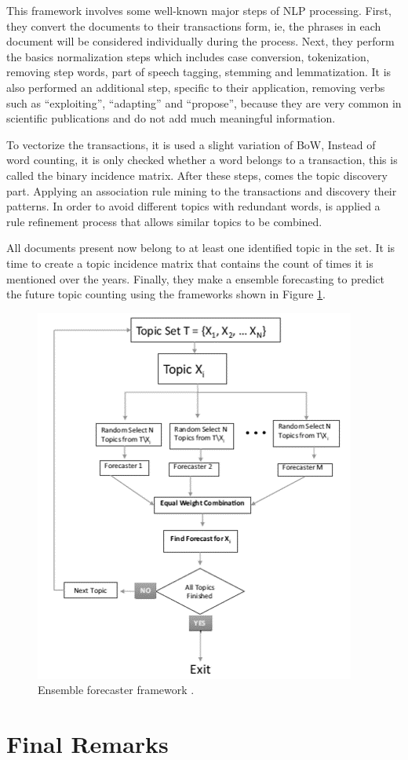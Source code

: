 This framework involves some well-known major steps of NLP processing. First, they convert the documents to their transactions form, ie, the phrases in each document will be considered individually during the process. Next, they perform the basics normalization steps which includes case conversion, tokenization, removing step words, part of speech tagging, stemming and lemmatization. It is also performed an additional step, specific to their application, removing verbs such as ``exploiting'', ``adapting'' and ``propose'', because they are very common in scientific publications and do not add much meaningful information.

To vectorize the transactions, it is used a slight variation of BoW, Instead of word counting, it is only checked whether a word belongs to a transaction, this is called the binary incidence matrix.
After these steps, comes the topic discovery part. Applying an association rule mining to the transactions and discovery their patterns. In order to avoid different topics with redundant words, is applied a rule refinement process that allows similar topics to be combined.


All documents present now belong to at least one identified topic in the set. It is time to create a topic incidence matrix that contains the count of times it is mentioned over the years. Finally, they make a ensemble forecasting to predict the future topic counting using the frameworks shown in Figure \ref{fig:ensemble-forecasting-framework}.

\begin{figure}[h!]
	\centering
	\includegraphics[width=0.5\linewidth]{01.Chapters/03.RelatedWorks/ensemble-forecasting-framework}
	\caption{Ensemble forecaster framework \cite{hurtado2016topic}.}
	\label{fig:ensemble-forecasting-framework}
\end{figure}





\section{Final Remarks}


